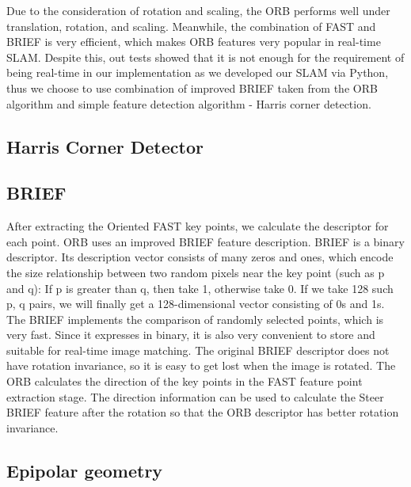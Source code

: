 Due to the consideration of rotation and scaling, the ORB performs well under translation, rotation, and scaling. Meanwhile, the combination of FAST and BRIEF is very efficient, which makes ORB features very popular in real-time SLAM. Despite this, out tests showed that it is not enough for the requirement of being real-time in our implementation as we developed our SLAM via Python, thus we choose to use combination of improved BRIEF taken from the ORB algorithm and simple feature detection algorithm - Harris corner detection.

\subsection{Harris Corner Detector}

\subsection{BRIEF}

After extracting the Oriented FAST key points, we calculate the descriptor for each point. ORB uses an improved BRIEF feature description. BRIEF is a binary descriptor. Its description vector consists of many zeros and ones, which encode the size relationship between two random pixels near the key point (such as p and q): If p is greater than q, then take 1, otherwise take 0. If we take 128 such p, q pairs, we will finally get a 128-dimensional vector consisting of 0s and 1s. The BRIEF implements the comparison of randomly selected points, which is very fast. Since it expresses in binary, it is also very convenient to store and suitable for real-time image matching. The original BRIEF descriptor does not have rotation invariance, so it is easy to get lost when the image is rotated. The ORB calculates the direction of the key points in the FAST feature point extraction stage. The direction information can be used to calculate the Steer BRIEF feature after the rotation so that the ORB descriptor has better rotation invariance. 


\subsection{Epipolar geometry}

